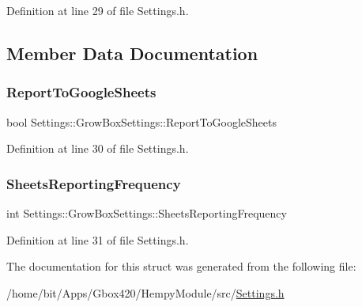 Definition at line 29 of file Settings.\+h.



\subsection{Member Data Documentation}
\mbox{\label{struct_settings_1_1_grow_box_settings_a464dc992e7fbcd7bc6f86203647433cd}} 
\subsubsection{\texorpdfstring{Report\+To\+Google\+Sheets}{ReportToGoogleSheets}}
{\footnotesize\ttfamily bool Settings\+::\+Grow\+Box\+Settings\+::\+Report\+To\+Google\+Sheets}



Definition at line 30 of file Settings.\+h.

\mbox{\label{struct_settings_1_1_grow_box_settings_aeb6b81dc659906f6966d6d4b3d450f9c}} 
\subsubsection{\texorpdfstring{Sheets\+Reporting\+Frequency}{SheetsReportingFrequency}}
{\footnotesize\ttfamily int Settings\+::\+Grow\+Box\+Settings\+::\+Sheets\+Reporting\+Frequency}



Definition at line 31 of file Settings.\+h.



The documentation for this struct was generated from the following file\+:\begin{DoxyCompactItemize}
\item 
/home/bit/\+Apps/\+Gbox420/\+Hempy\+Module/src/\hyperlink{_hempy_module_2src_2_settings_8h}{Settings.\+h}\end{DoxyCompactItemize}
